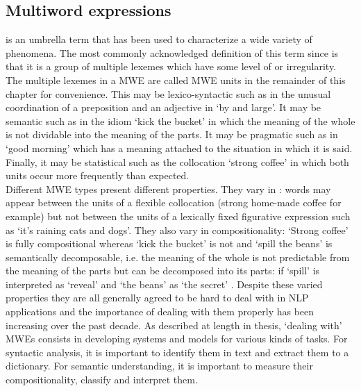 \documentclass[output=paper]{langsci/langscibook}
\begin{document}
\subsection{Multiword expressions}
\label{del:MWEs}
\indent {} is an umbrella term that has been used to characterize a wide variety of phenomena. The most commonly acknowledged definition of this term since \citet{sag02} is that it is a group of multiple lexemes which have some level of  or irregularity. The multiple lexemes in a MWE are called MWE units in the remainder of this chapter for convenience. This  may be lexico-syntactic such as in the unusual coordination of a preposition and an adjective in `by and large'. It may be semantic such as in the idiom `kick the bucket' in which the meaning of the whole is not dividable into the meaning of the parts. It may be pragmatic such as in `good morning' which has a meaning attached to the situation in which it is said. Finally, it may be statistical such as the collocation `strong coffee' in which both units occur more frequently than expected.\\
\indent Different MWE types present different properties. They vary in : words may appear between the units of a flexible collocation (strong home-made coffee for example) but not between the units of a lexically fixed figurative expression such as `it's raining cats and dogs'. They also vary in compositionality: `Strong coffee' is fully compositional whereas `kick the bucket' is not and `spill the beans' is semantically decomposable, i.e. the meaning of the whole is not predictable from the meaning of the parts but can be decomposed into its parts: if `spill' is interpreted as `reveal' and `the beans' as `the secret' \citep{nunberg94}.
Despite these varied properties they are all generally agreed to be hard to deal with in NLP applications \citep{sag02} and the importance of dealing with them properly has been increasing over the past decade. As described at length in  thesis, `dealing with' MWEs consists in developing systems and models for various kinds of tasks. For syntactic analysis, it is important to identify them in text and extract them to a dictionary. For semantic understanding, it is important to measure their compositionality, classify and interpret them.
\end{document}

